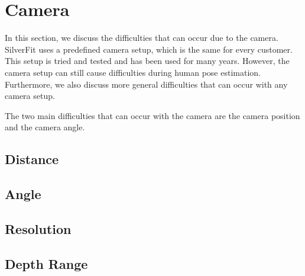 \section{Camera}

In this section, we discuss the difficulties that can occur due to the camera. SilverFit uses a predefined camera setup, which is the same for every customer. This setup is tried and tested and has been used for many years. However, the camera setup can still cause difficulties during human pose estimation. Furthermore, we also discuss more general difficulties that can occur with any camera setup.

The two main difficulties that can occur with the camera are the camera position and the camera angle. 

\subsection{Distance}

\subsection{Angle}

\subsection{Resolution}

\subsection{Depth Range}